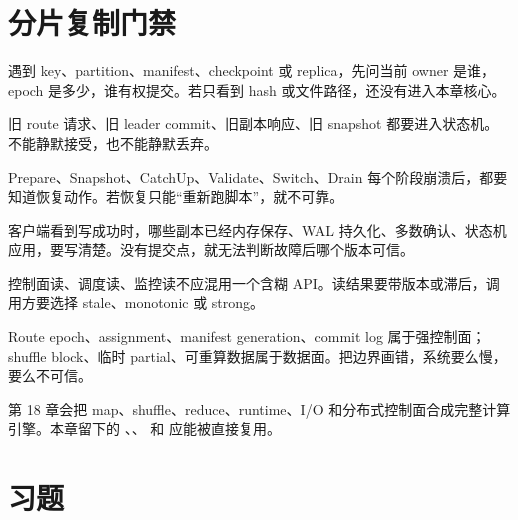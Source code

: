 \section{分片复制门禁}

遇到 key、partition、manifest、checkpoint 或 replica，先问当前 owner 是谁，epoch 是多少，谁有权提交。若只看到 hash 或文件路径，还没有进入本章核心。

旧 route 请求、旧 leader commit、旧副本响应、旧 snapshot 都要进入状态机。不能静默接受，也不能静默丢弃。

Prepare、Snapshot、CatchUp、Validate、Switch、Drain 每个阶段崩溃后，都要知道恢复动作。若恢复只能“重新跑脚本”，就不可靠。

客户端看到写成功时，哪些副本已经内存保存、WAL 持久化、多数确认、状态机应用，要写清楚。没有提交点，就无法判断故障后哪个版本可信。

控制面读、调度读、监控读不应混用一个含糊 API。读结果要带版本或滞后，调用方要选择 stale、monotonic 或 strong。

Route epoch、assignment、manifest generation、commit log 属于强控制面；shuffle block、临时 partial、可重算数据属于数据面。把边界画错，系统要么慢，要么不可信。

第 18 章会把 map、shuffle、reduce、runtime、I/O 和分布式控制面合成完整计算引擎。本章留下的 、、 和  应能被直接复用。

\section{习题}

